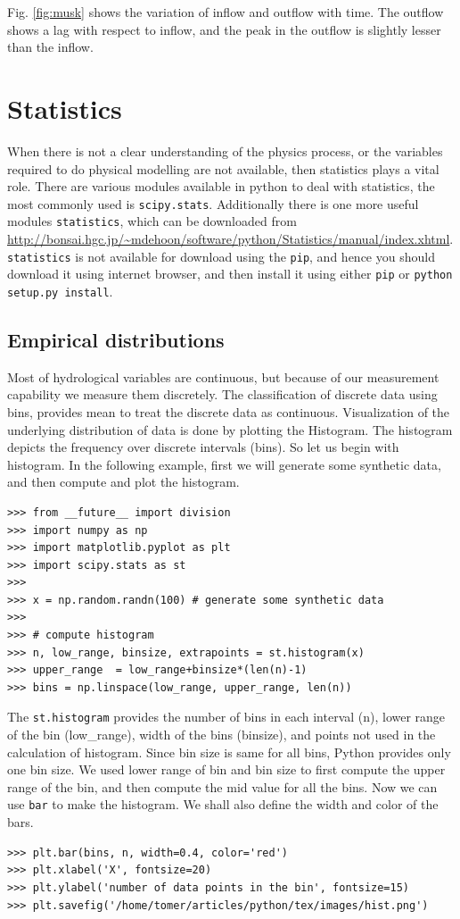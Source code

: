 \documentclass[10pt]{book}
\begin{document}
{Fig. \ref{fig:musk} shows the variation of inflow and outflow with time. The outflow shows a lag with respect to inflow, and the peak in the outflow is slightly lesser than the inflow.

\chapter{Statistics}
When there is not a clear understanding of the physics process, or the variables required to do physical modelling are not available, then statistics plays a vital role. There are various modules available in python to deal with statistics, the most commonly used is \verb"scipy.stats". Additionally there is one more useful modules \verb"statistics", which can be downloaded from \url{http://bonsai.hgc.jp/~mdehoon/software/python/Statistics/manual/index.xhtml}. \verb"statistics" is not available for download using the \verb"pip", and hence you should download it using internet browser, and then install it using either \verb"pip" or \verb"python setup.py install". 

\section{Empirical distributions}
Most of hydrological variables are continuous, but because of our measurement capability we measure them discretely. The classification of discrete data using bins, provides mean to treat the discrete data as continuous. Visualization of the underlying distribution of data is done by plotting the Histogram.  The histogram depicts the frequency over discrete intervals (bins). So let us begin with histogram. In the following example, first we will generate some synthetic data, and then compute and plot the histogram. 

\beforeverb \begin{verbatim}
>>> from __future__ import division
>>> import numpy as np
>>> import matplotlib.pyplot as plt
>>> import scipy.stats as st
>>> 
>>> x = np.random.randn(100) # generate some synthetic data
>>> 
>>> # compute histogram
>>> n, low_range, binsize, extrapoints = st.histogram(x)
>>> upper_range  = low_range+binsize*(len(n)-1)
>>> bins = np.linspace(low_range, upper_range, len(n))
\end{verbatim} \afterverb
The \verb"st.histogram" provides the number of bins in each interval (n), lower range of the bin (low\_range), width of the bins (binsize), and points not used in the calculation of histogram. Since bin size is same for all bins, Python provides only one bin size. We used lower range of bin and bin size to first compute the upper range of the bin, and then compute the mid value for all the bins. Now we can use \verb"bar" to make the histogram. We shall also define the width and color of the bars. 
\beforeverb \begin{verbatim}
>>> plt.bar(bins, n, width=0.4, color='red')
>>> plt.xlabel('X', fontsize=20)
>>> plt.ylabel('number of data points in the bin', fontsize=15)
>>> plt.savefig('/home/tomer/articles/python/tex/images/hist.png')
\end{verbatim} \afterverb

}
\end{document}
